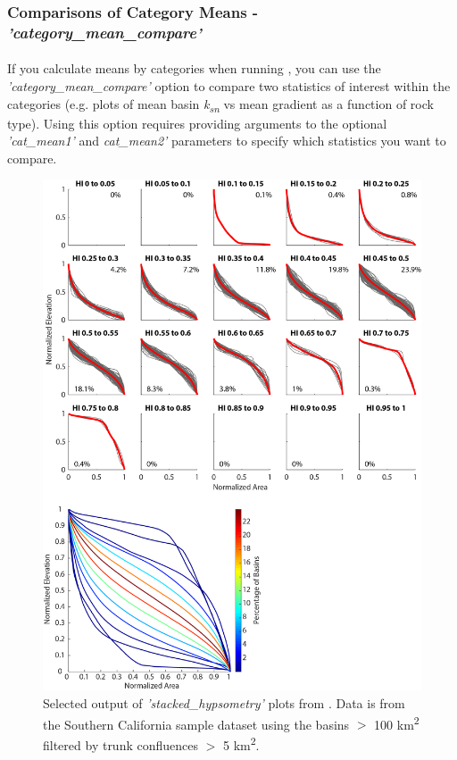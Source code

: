 \subsubsection{Comparisons of Category Means - \textit{'category\_mean\_compare'}} \label{sec:catcomp}
\paragraph{}If you calculate means by categories when running , you can use the \textit{'category\_mean\_compare'} option to compare two statistics of interest within the categories (e.g. plots of mean basin \textit{k\textsubscript{sn}} vs mean gradient as a function of rock type). Using this option requires providing arguments to the optional \textit{'cat\_mean1'}  and \textit{cat\_mean2'} parameters to specify which statistics you want to compare.

\begin{figure}[H]
	\centering
	\includegraphics[width=12cm]{PNGs/BasinHypsometry.png}
	\caption{Selected output of \textit{'stacked\_hypsometry'} plots from . Data is from the Southern California sample dataset using the basins $>$ 100 km\textsuperscript{2}  filtered by trunk confluences $>$ 5 km\textsuperscript{2}.}
	\label{fig:Hyps}
\end{figure}

